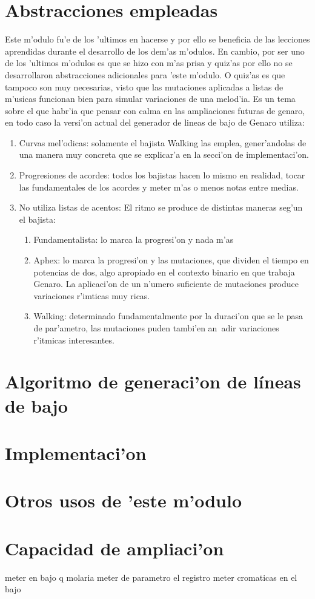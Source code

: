 \section{Abstracciones empleadas}
Este m'odulo fu'e de los 'ultimos en hacerse y por ello se beneficia de las lecciones aprendidas durante el desarrollo de los dem'as m'odulos. En cambio, por ser uno de los 'ultimos m'odulos es que se hizo con m'as prisa y quiz'as por ello no se desarrollaron abstracciones adicionales para 'este m'odulo. O quiz'as es que tampoco son muy necesarias, visto que las mutaciones aplicadas a listas de m'usicas funcionan bien para simular variaciones de una melod'ia. Es un tema sobre el que habr'ia que pensar con calma en las ampliaciones futuras de genaro, en todo caso la versi'on actual del generador de lineas de bajo de Genaro utiliza:
        \begin{enumerate}
        \item Curvas mel'odicas: solamente el bajista Walking las emplea, gener'andolas de una manera muy concreta que se explicar'a en la secci'on de implementaci'on.
        \item Progresiones de acordes: todos los bajistas hacen lo mismo en realidad, tocar las fundamentales de los acordes y meter m'as o menos notas entre medias.
        \item No utiliza listas de acentos: El ritmo se produce de distintas maneras seg'un el bajista:
                \begin{enumerate}
                \item Fundamentalista: lo marca la progresi'on y nada m'as
                \item Aphex: lo marca la progresi'on y las mutaciones, que dividen el tiempo en potencias de dos, algo apropiado en el contexto binario en que trabaja Genaro. La aplicaci'on de un n'umero suficiente de mutaciones produce variaciones r'imticas muy ricas.
                \item Walking: determinado fundamentalmente por la duraci'on que se le pasa de par'ametro, las mutaciones puden tambi'en an~adir variaciones r'itmicas interesantes.
                \end{enumerate}
        \end{enumerate}

\section{Algoritmo de generaci'on de l\'ineas de bajo}



\section{Implementaci'on}

\section {Otros usos de 'este m'odulo}

\section {Capacidad de ampliaci'on}
meter en bajo q molaria meter de parametro el registro
meter cromaticas en el bajo
